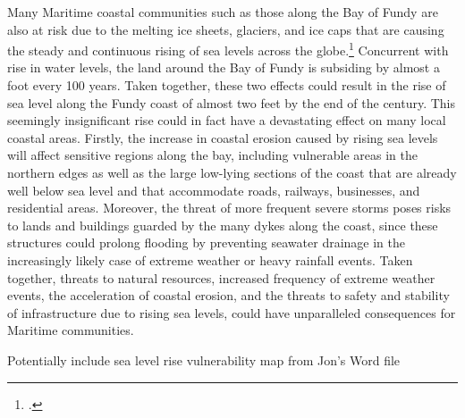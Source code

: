 Many Maritime coastal communities such as those along the Bay of Fundy are also at risk due to the melting ice sheets, glaciers, and ice caps that are causing the steady and continuous rising of sea levels across the globe.\footcite[][]{PercyRisingTide}
Concurrent with rise in water levels, the land around the Bay of Fundy is subsiding by almost a foot every 100 years.
Taken together, these two effects could result in the rise of sea level along the Fundy coast of almost two feet by the end of the century.
This seemingly insignificant rise could in fact have a devastating effect on many local coastal areas.
Firstly, the increase in coastal erosion caused by rising sea levels will affect sensitive regions along the bay, including vulnerable areas in the northern edges as well as the large low-lying sections of the coast that are already well below sea level and that accommodate roads, railways, businesses, and residential areas. 
Moreover, the threat of more frequent severe storms poses risks to lands and buildings guarded by the many dykes along the coast, since these structures could prolong flooding by preventing seawater drainage in the increasingly likely case of extreme weather or heavy rainfall events. 
Taken together, threats to natural resources, increased frequency of extreme weather events, the acceleration of coastal erosion, and the threats to safety and stability of infrastructure due to rising sea levels, could have unparalleled consequences for Maritime communities. 

\begin{vcom}		
Potentially include sea level rise vulnerability map from Jon's Word file 
\end{vcom}

